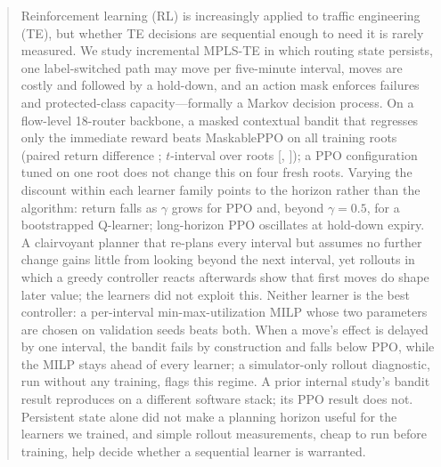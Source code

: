 \begin{abstract}
Reinforcement learning (RL) is increasingly applied to traffic engineering
(TE), but whether TE decisions are sequential enough to need it is rarely
measured. We study incremental MPLS-TE in which routing state persists, one
label-switched path may move per five-minute interval, moves are costly and
followed by a hold-down, and an action mask enforces failures and
protected-class capacity---formally a Markov decision process. On a
flow-level 18-router backbone, a masked contextual bandit that regresses only
the immediate reward beats MaskablePPO on all \TestBanditRoots{} training
roots (paired return difference \Gap; $t$-interval over roots [\GapTLo,
\GapTHi]); a PPO configuration tuned on one root does not change this on four
fresh roots. Varying the discount within each learner family points to the
horizon rather than the algorithm: return falls as $\gamma$ grows for PPO and,
beyond $\gamma=0.5$, for a bootstrapped Q-learner; long-horizon PPO oscillates at hold-down
expiry. A clairvoyant planner that re-plans every interval but assumes no further
change gains little from looking beyond the next interval, yet rollouts in
which a greedy controller reacts afterwards show that first moves do shape
later value; the learners did not exploit this. Neither learner is the best controller: a
per-interval min-max-utilization MILP whose two parameters are chosen on
validation seeds beats both. When a move's effect is delayed by one interval,
the bandit fails by construction and falls below PPO, while the MILP stays
ahead of every learner; a simulator-only rollout diagnostic, run without any
training, flags this regime. A prior internal study's bandit result reproduces on
a different software stack; its PPO result does not. Persistent state alone
did not make a planning horizon useful for the learners we trained, and
simple rollout measurements, cheap to run before training, help decide
whether a sequential learner is warranted.
\end{abstract}

